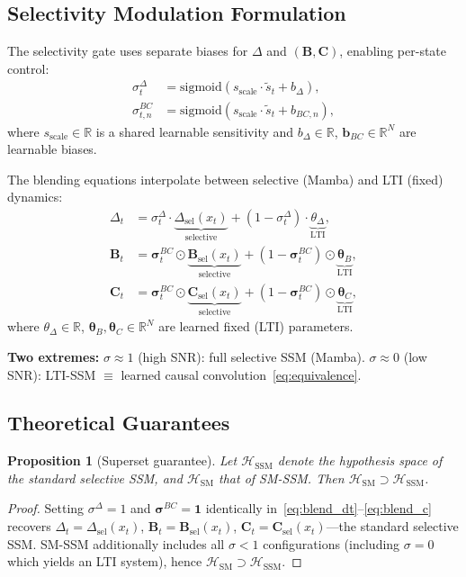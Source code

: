 \documentclass[journal]{IEEEtran}
\newtheorem{proposition}{Proposition}
\begin{document}
\subsection{Selectivity Modulation Formulation}

The selectivity gate uses separate biases for $\Delta$ and $(\mathbf{B}, \mathbf{C})$, enabling per-state control:
\begin{align}
\sigma^\Delta_t &= \text{sigmoid}(s_{\text{scale}} \cdot \tilde{s}_t + b_\Delta), \label{eq:sigma_dt} \\
\sigma^{BC}_{t,n} &= \text{sigmoid}(s_{\text{scale}} \cdot \tilde{s}_t + b_{BC,n}), \label{eq:sigma_bc}
\end{align}
where $s_{\text{scale}} \in \mathbb{R}$ is a shared learnable sensitivity and $b_\Delta \in \mathbb{R}$, $\mathbf{b}_{BC} \in \mathbb{R}^N$ are learnable biases.

The blending equations interpolate between selective (Mamba) and LTI (fixed) dynamics:
\begin{align}
\Delta_t &= \sigma^\Delta_t \cdot \underbrace{\Delta_{\text{sel}}(x_t)}_{\text{selective}} + (1{-}\sigma^\Delta_t) \cdot \underbrace{\theta_\Delta}_{\text{LTI}}, \label{eq:blend_dt} \\
\mathbf{B}_t &= \bm{\sigma}^{BC}_t \odot \underbrace{\mathbf{B}_{\text{sel}}(x_t)}_{\text{selective}} + (1{-}\bm{\sigma}^{BC}_t) \odot \underbrace{\bm{\theta}_B}_{\text{LTI}}, \label{eq:blend_b} \\
\mathbf{C}_t &= \bm{\sigma}^{BC}_t \odot \underbrace{\mathbf{C}_{\text{sel}}(x_t)}_{\text{selective}} + (1{-}\bm{\sigma}^{BC}_t) \odot \underbrace{\bm{\theta}_C}_{\text{LTI}}, \label{eq:blend_c}
\end{align}
where $\theta_\Delta \in \mathbb{R}$, $\bm{\theta}_B, \bm{\theta}_C \in \mathbb{R}^N$ are learned fixed (LTI) parameters.

\smallskip\noindent\textbf{Two extremes:}
$\sigma \approx 1$ (high SNR): full selective SSM (Mamba).
$\sigma \approx 0$ (low SNR): LTI-SSM $\equiv$ learned causal convolution~\eqref{eq:equivalence}.

\subsection{Theoretical Guarantees}

\begin{proposition}[Superset guarantee]
\label{prop:superset}
Let $\mathcal{H}_{\text{SSM}}$ denote the hypothesis space of the standard selective SSM, and $\mathcal{H}_{\text{SM}}$ that of SM-SSM. Then $\mathcal{H}_{\text{SM}} \supset \mathcal{H}_{\text{SSM}}$.
\end{proposition}
\begin{proof}
Setting $\sigma^\Delta = 1$ and $\bm{\sigma}^{BC} = \mathbf{1}$ identically in~\eqref{eq:blend_dt}--\eqref{eq:blend_c} recovers $\Delta_t = \Delta_{\text{sel}}(x_t)$, $\mathbf{B}_t = \mathbf{B}_{\text{sel}}(x_t)$, $\mathbf{C}_t = \mathbf{C}_{\text{sel}}(x_t)$---the standard selective SSM.
SM-SSM additionally includes all $\sigma < 1$ configurations (including $\sigma = 0$ which yields an LTI system), hence $\mathcal{H}_{\text{SM}} \supset \mathcal{H}_{\text{SSM}}$.
\end{proof}
\end{document}
